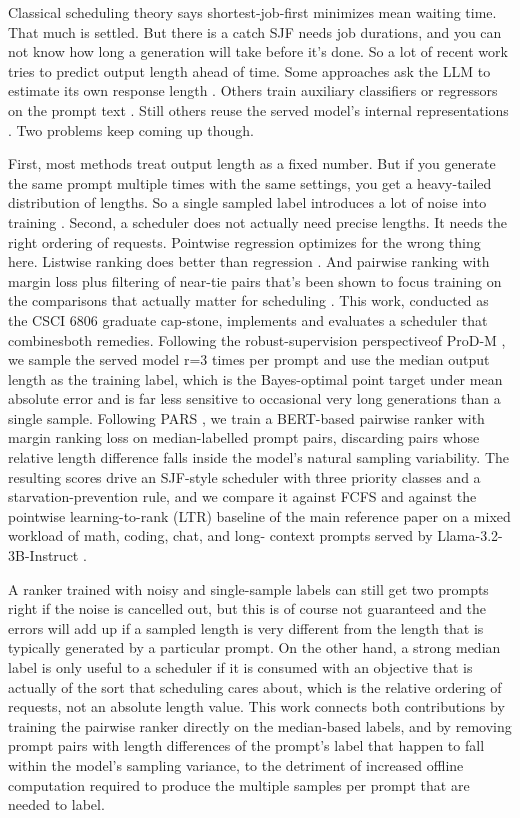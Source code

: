 \documentclass[conference]{IEEEtran}
\begin{document}
Classical scheduling theory says shortest-job-first minimizes mean waiting time. That much is settled. But there is a catch  SJF needs job durations, and you can not know how long a generation will take before it's done.
So a lot of recent work tries to predict output length ahead of time. Some approaches ask the LLM to estimate its own response length \cite{zheng2023response}. Others train auxiliary classifiers or regressors on the prompt text \cite{jin2023s3,qiu2024ssjf}. Still others reuse the served model's internal representations \cite{shahout2025trail,xie2026egtp}. Two problems keep coming up though.

First, most methods treat output length as a fixed number. But if you generate the same prompt multiple times with the same settings, you get a heavy-tailed distribution of lengths. So a single sampled label introduces a lot of noise into training \cite{wang2026prodm}. Second, a scheduler does not actually need precise lengths. It needs the right ordering of requests. Pointwise regression optimizes for the wrong thing here.
Listwise ranking does better than regression \cite{fu2024efficient}. And pairwise ranking with margin loss plus filtering of near-tie pairs  that's been shown to focus training on the comparisons that actually matter for scheduling \cite{tao2025pars}.
This work, conducted as the CSCI 6806 graduate cap-stone, implements and evaluates a scheduler that combinesboth remedies. Following the robust-supervision perspectiveof ProD-M \cite{wang2026prodm}, we sample the served model r=3 times per prompt and use the median output length as the training label, which is the Bayes-optimal point target under mean absolute error and is far less sensitive to occasional very long generations than a single sample. Following PARS \cite{tao2025pars}, we train a BERT-based pairwise ranker with margin ranking loss on median-labelled prompt pairs, discarding pairs whose relative length difference falls inside the model's natural sampling variability. The resulting scores drive an SJF-style scheduler
with three priority classes and a starvation-prevention rule, and we compare it against FCFS and against the pointwise learning-to-rank (LTR) baseline of the main reference paper \cite{fu2024efficient} on a mixed workload of math, coding, chat, and long-
context prompts served by Llama-3.2-3B-Instruct \cite{dubey2024llama3}.

A ranker trained with noisy and single-sample labels can still get two prompts right if the noise is cancelled out, but this is of course not guaranteed and the errors will add up if a sampled length is very different from the length that is typically generated by a particular prompt. On the other hand, a strong median label is only useful to a scheduler if it is consumed with an objective that is actually of the sort that scheduling cares about, which is the relative ordering of requests, not an absolute length value. This work connects both contributions by training the pairwise ranker directly on the median-based labels, and by removing prompt pairs with length differences of the prompt's label that happen to fall within the model's sampling variance, to the detriment of increased offline computation required to produce the multiple samples per prompt that are needed to label.
\end{document}
